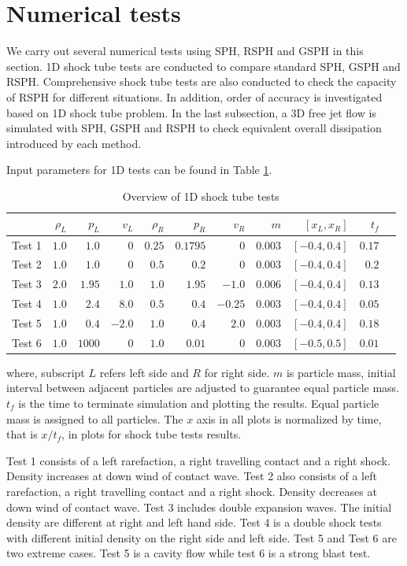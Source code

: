 \section{Numerical tests}
We carry out several numerical tests using SPH, RSPH and GSPH in this section.
1D shock tube tests are conducted to compare standard SPH, GSPH and RSPH. Comprehensive shock tube tests are also conducted to check the capacity of RSPH for different situations. In addition, order of accuracy is investigated based on 1D shock tube problem. 
In the last subsection, a 3D free jet flow is simulated with SPH, GSPH and RSPH to check equivalent overall dissipation introduced by each method.

Input parameters for 1D tests can be found in Table \ref{tab:1D-shock-input_parameters}. 
\begin{table}[htp]
\centering
      \caption{Overview of 1D shock tube tests}		
	  \begin{tabular}{lrrrrrrrrrr}
	    \hline
	          & $\rho_L$ & $p_L$ &$v_L$ & $\rho_R$ & $p_R$ &$v_R$ & $m$ & $[x_L, x_R]$ & $t_f$\\
	    \hline
	    Test 1 & $1.0$ & $1.0$ &$0$ & $0.25$ & $0.1795$ &$0$ & $0.003$  & $[-0.4, 0.4]$ & $0.17$\\
	    	Test 2 & $1.0$ & $1.0$ &$0$ & $0.5$ & $0.2$ &$0$ & $0.003$  & $[-0.4, 0.4]$ & $0.2$\\
	    	Test 3 & $2.0$ & $1.95$ &$1.0$ & $1.0$ & $1.95$ &$-1.0$  & $0.006$  & $[-0.4, 0.4]$ & $0.13$\\
	    Test 4 & $1.0$ & $2.4$ &$8.0$ & $0.5$ & $0.4$ &$-0.25$ & $0.003$  & $[-0.4, 0.4]$ & $0.05$\\
	    	Test 5 & $1.0$ & $0.4$ &$-2.0$ & $1.0$ & $0.4$ &$2.0$ & $0.003$  & $[-0.4, 0.4]$ & $0.18$\\
	    	Test 6 & $1.0$ & $1000$ &$0$ & $1.0$ & $0.01$ &$0$ & $0.003$  & $[-0.5, 0.5]$  & $0.01$\\
	    \hline
	  \end{tabular}
	  \label{tab:1D-shock-input_parameters}
\end{table}
where, subscript $L$ refers left side and $R$ for right side. $m$ is particle mass, initial interval between adjacent particles are adjusted to guarantee equal particle mass. $t_f$ is the time to terminate simulation and plotting the results. Equal particle mass is assigned to all particles. The $x$ axis in all plots is normalized by time, that is $x/t_f$, in plots for shock tube tests results.

Test 1 consists of a left rarefaction, a right travelling contact and a right shock. Density increases at down wind of contact wave.
Test 2 also consists of a left rarefaction, a right travelling contact and a right shock. Density decreases at down wind of contact wave.
Test 3 includes double expansion waves. The initial density are different at right and left hand side.
Test 4 is a double shock tests with different initial density on the right side and left side.
Test 5 and Test 6 are two extreme cases. Test 5 is a cavity flow while test 6 is a strong blast test.

